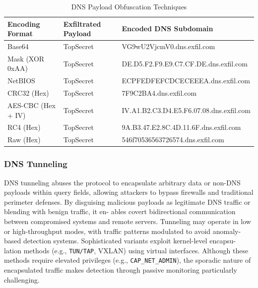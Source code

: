 \documentclass [11pt, proquest] {uwthesis}[2020/02/24]
\begin{document}
\begin{table}[H]
\centering
\begin{tabular}{|l|l|l|}
\hline
\textbf{Encoding Format} & \textbf{Exfiltrated Payload} & \textbf{Encoded DNS Subdomain} \\
\hline
Base64 & TopSecret & VG9wU2VjcmV0.dns.exfil.com \\
\hline
Mask (XOR 0xAA) & TopSecret & DE.D5.F2.F9.E9.C7.CF.DE.dns.exfil.com \\
\hline
NetBIOS & TopSecret & ECPFEDFEFCDCECEEEA.dns.exfil.com \\
\hline
CRC32 (Hex) & TopSecret & 7F9C2BA4.dns.exfil.com \\
\hline
AES-CBC (Hex + IV) & TopSecret & IV.A1.B2.C3.D4.E5.F6.07.08.dns.exfil.com \\
\hline
RC4 (Hex) & TopSecret & 9A.B3.47.E2.8C.4D.11.6F.dns.exfil.com
\\
\hline
Raw (Hex) & TopSecret & 546f70536563726574.dns.exfil.com
\\
\hline
\end{tabular}
\caption{DNS Payload Obfuscation Techniques}
\label{dns_payload_obfuscation}
\end{table}

\subsubsection{DNS Tunneling}
DNS tunneling abuses the protocol to encapsulate arbitrary data or non-DNS payloads within
query fields, allowing attackers to bypass firewalls and traditional perimeter defenses. By
disguising malicious payloads as legitimate DNS traffic or blending with benign traffic, it en-
ables covert bidirectional communication between compromised systems and remote servers.
Tunneling may operate in low or high-throughput modes, with traffic patterns modulated to
avoid anomaly-based detection systems. Sophisticated variants exploit kernel-level encapsu-
lation methods (e.g., \texttt{TUN/TAP}, VXLAN) using virtual interfaces. Although these methods
require elevated privileges (e.g., \texttt{CAP\_NET\_ADMIN}), the sporadic nature of encapsulated traffic
makes detection through passive monitoring particularly challenging.
\end{document}
